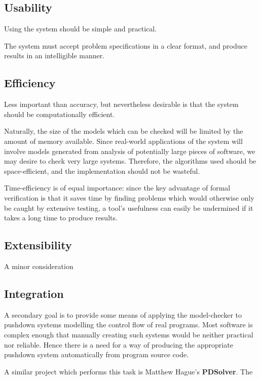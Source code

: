 \documentclass[11pt]{article}
\theoremstyle{definition}
\begin{document}

\subsection{Usability}

Using the system should be simple and practical.

The system must accept problem specifications in a clear format, 
and produce results in an intelligible manner.

\subsection{Efficiency}

Less important than accuracy, but nevertheless desirable is that the system
should be computationally efficient. 

Naturally, the size of the models which can be checked will be limited by the
amount of memory available. Since real-world applications of the system will
involve models generated from analysis of potentially large pieces of software,
we may desire to check very large systems. Therefore, the algorithms used
should be space-efficient, and the implementation should not be wasteful.

Time-efficiency is of equal importance: since the key advantage of formal
verification is that it saves time by finding problems which would otherwise
only be caught by extensive testing, a tool's usefulness can easily be
undermined if it takes a long time to produce results.

\subsection{Extensibility}

A minor consideration 

\subsection{Integration}
A secondary goal is to provide some means of applying the model-checker to
pushdown systems modelling the control flow of real programs. Most software is
complex enough that manually creating such systems would be neither practical
nor reliable. Hence there is a need for a way of producing the appropriate
pushdown system automatically from program source code.

A similar project which performs this task is Matthew Hague's \textbf{PDSolver}.
The 
\end{document}
